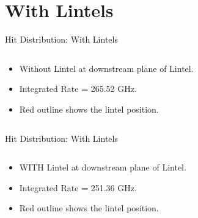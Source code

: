 \documentclass[aspectratio=1610]{beamer}
\begin{document}
\section{With Lintels}
%
%
%
\begin{frame}{Hit Distribution: With Lintels}
    \begin{columns}
        \begin{column}{0.39\textwidth}
            \begin{itemize}
                \item Without Lintel at downstream plane of Lintel.
                \item Integrated Rate = 265.52 GHz.
                \item Red outline shows the lintel position.
            \end{itemize}
        \end{column}
        \begin{column}{0.59\textwidth}
        \end{column}
    \end{columns}
\end{frame}
%
%
%
%
\begin{frame}{Hit Distribution: With Lintels}
    \begin{columns}
        \begin{column}{0.39\textwidth}
            \begin{itemize}
                \item WITH Lintel at downstream plane of Lintel.
                \item Integrated Rate = 251.36 GHz.
                \item Red outline shows the lintel position.
            \end{itemize}
        \end{column}
        \begin{column}{0.59\textwidth}
        \end{column}
    \end{columns}
\end{frame}
%
%
%
%
\end{document}
